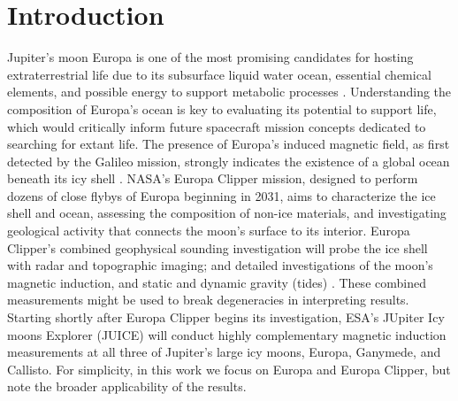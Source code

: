\documentclass[journal=aesccq,manuscript=article]{achemso}
\begin{document}
\section{Introduction}

Jupiter's moon Europa is one of the most promising candidates for hosting extraterrestrial life due to its subsurface liquid water ocean, essential chemical elements, and possible energy to support metabolic processes \cite{kivelson2000galileo, vance2023investigating, NASARoadmapOceanWorlds,isik_thermodynamic_2025}. 
Understanding the composition of Europa's ocean is key to evaluating its potential to support life, which would critically inform future spacecraft mission concepts dedicated to searching for extant life\cite{vance2023investigating}. 
The presence of Europa's induced magnetic field, as first detected by the Galileo mission, strongly indicates the existence of a global ocean beneath its icy shell \cite{kivelson2000galileo}. 
NASA's Europa Clipper mission, designed to perform dozens of close flybys of Europa beginning in 2031, aims to characterize the ice shell and ocean, assessing the composition of non-ice materials, and investigating geological activity that connects the moon's surface to its interior\cite{roberts2023exploring}. 
 Europa Clipper's combined geophysical sounding investigation will probe the ice shell with radar and topographic imaging; and detailed investigations of the moon's magnetic induction, and static and dynamic gravity (tides) \citep{roberts2023exploring}. 
 These combined measurements might be used to break degeneracies in interpreting results.
Starting shortly after Europa Clipper begins its investigation, ESA's JUpiter Icy moons Explorer (JUICE) will conduct highly complementary magnetic induction measurements at all three of Jupiter's large icy moons, Europa, Ganymede, and Callisto\cite{vanhoolst2024geophysical}.
For simplicity, in this work we focus on Europa and Europa Clipper, but note the broader applicability of the results.
\end{document}
